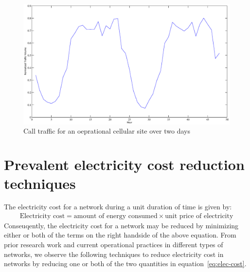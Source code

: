 \begin{figure}
\includegraphics[width=1\textwidth]{pics/waridworkload.eps}
\caption{Call traffic for an oeprational cellular site over two days}
\label{fig:varwork}
\end{figure} 

\section{Prevalent electricity cost reduction techniques} %

The electricity cost for a network during a unit duration of time is given by:
\begin{align}
\text{Electricity cost} = \text{amount of energy consumed} \times \text{unit price of electricity}
\label{eq:elec-cost}
\end{align}
Conseuqently, the electricity cost for a network may be reduced by minimizing either or both of the terms on the right handside of the above equation. From prior research work and current operational practices in different types of networks, we observe the following techniques to reduce electricity cost in networks by reducing one or both of the two quantities in equation~\ref{eq:elec-cost}.

